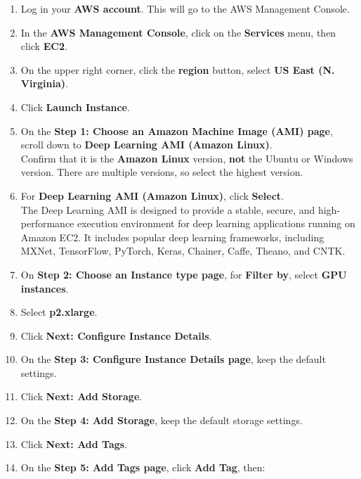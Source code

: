 \documentclass[]{book}
\providecommand{\tightlist}{%
  \setlength{\itemsep}{0pt}\setlength{\parskip}{0pt}}
\begin{document}
\begin{enumerate}
\def\labelenumi{\arabic{enumi}.}
\setcounter{enumi}{11}
\tightlist
\item
  Log in your \textbf{AWS account}. This will go to the AWS Management Console.
\item
  In the \textbf{AWS Management Console}, click on the \textbf{Services} menu, then click \textbf{EC2}.
\item
  On the upper right corner, click the \textbf{region} button, select \textbf{US East (N. Virginia)}.
\item
  Click \textbf{Launch Instance}.
\item
  On the \textbf{Step 1: Choose an Amazon Machine Image (AMI) page}, scroll down to \textbf{Deep Learning AMI (Amazon Linux)}.\\
  Confirm that it is the \textbf{Amazon Linux} version, \textbf{not} the Ubuntu or Windows version. There are multiple versions, so select the highest version.
\item
  For \textbf{Deep Learning AMI (Amazon Linux)}, click \textbf{Select}.\\
  The Deep Learning AMI is designed to provide a stable, secure, and high-performance execution environment for deep learning applications running on Amazon EC2. It includes popular deep learning frameworks, including MXNet, TensorFlow, PyTorch, Keras, Chainer, Caffe, Theano, and CNTK.
\item
  On \textbf{Step 2: Choose an Instance type page}, for \textbf{Filter by}, select \textbf{GPU instances}.
\item
  Select \textbf{p2.xlarge}.
\item
  Click \textbf{Next: Configure Instance Details}.
\item
  On the \textbf{Step 3: Configure Instance Details page}, keep the default settings.
\item
  Click \textbf{Next: Add Storage}.
\item
  On the \textbf{Step 4: Add Storage}, keep the default storage settings.
\item
  Click \textbf{Next: Add Tags}.
\item
  On the \textbf{Step 5: Add Tags page}, click \textbf{Add Tag}, then:


\end{enumerate}
\end{document}
